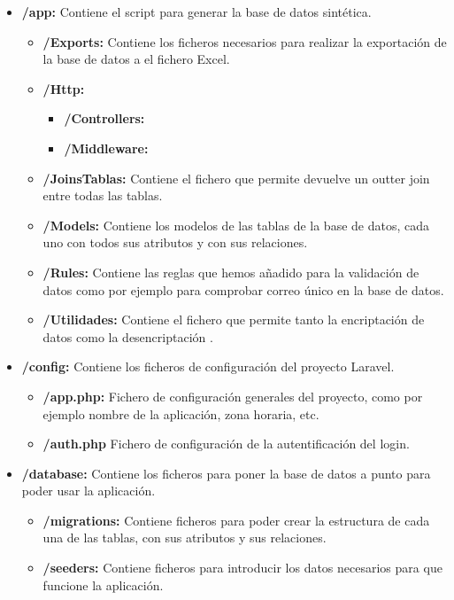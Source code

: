 \begin{itemize}
    \item \textbf{/app:} Contiene el script para generar la base de datos sintética.
    \begin{itemize}
        \item \textbf{/Exports:} Contiene los ficheros necesarios para realizar la exportación de la base de datos a el fichero Excel.
        \item \textbf{/Http:} 
        \begin{itemize}
            \item \textbf{/Controllers:}
            \item \textbf{/Middleware:}
        \end{itemize}
        \item \textbf{/JoinsTablas:} Contiene el fichero que permite devuelve un outter join entre todas las tablas.
        \item \textbf{/Models:} Contiene los modelos de las tablas de la base de datos, cada uno con todos sus atributos y con sus relaciones.
        \item \textbf{/Rules:} Contiene las reglas que hemos añadido para la validación de datos como por ejemplo para comprobar correo único en la base de datos.
        \item \textbf{/Utilidades:} Contiene el fichero que permite tanto la encriptación de datos como la desencriptación .
    \end{itemize}
    \item \textbf{/config:} Contiene los ficheros de configuración del proyecto Laravel.
    \begin{itemize}
        \item \textbf{/app.php:} Fichero de configuración generales del proyecto, como por ejemplo nombre de la aplicación, zona horaria, etc.
        \item \textbf{/auth.php} Fichero de configuración de la autentificación del login.
    \end{itemize}
    \item \textbf{/database:} Contiene los ficheros para poner la base de datos a punto para poder usar la aplicación.
    \begin{itemize}
        \item \textbf{/migrations:} Contiene ficheros para poder crear la estructura de cada una de las tablas, con sus atributos y sus relaciones.
        \item \textbf{/seeders:} Contiene ficheros para introducir los datos necesarios para que funcione la aplicación.

\end{itemize}
\end{itemize}
